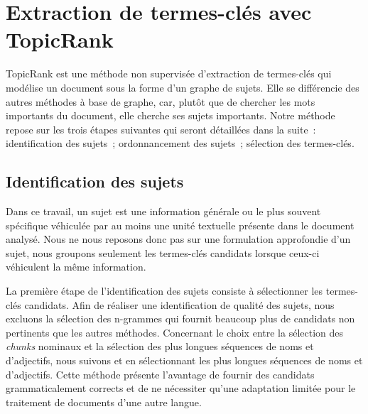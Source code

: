 \section{Extraction de termes-clés avec TopicRank}
\label{sec:extraction_de_termes_cles_avec_topicrank}
  TopicRank est une méthode non supervisée d'extraction de termes-clés qui
  modélise un document sous la forme d'un graphe de sujets.
  Elle se différencie des autres méthodes à base de graphe, car, plutôt que de
  chercher les mots importants du document, elle cherche ses sujets importants.
  Notre méthode repose sur les trois étapes suivantes qui seront détaillées dans
  la suite~: identification des sujets~; ordonnancement des sujets~; sélection des termes-clés.

  \subsection{Identification des sujets}
  \label{subsec:identification_des_sujets}
    Dans ce travail, un sujet est une information générale ou le plus souvent
    spécifique véhiculée par au moins une unité textuelle présente dans le
    document analysé. Nous ne nous reposons donc pas sur une formulation
    approfondie d'un sujet, nous groupons seulement les termes-clés candidats
    lorsque ceux-ci véhiculent la même information.

    La première étape de l'identification des sujets consiste à sélectionner les
    termes-clés candidats.
    Afin de réaliser une identification de qualité des sujets, nous excluons la
    sélection des n-grammes qui fournit beaucoup plus de candidats non
    pertinents que les autres méthodes. Concernant le choix entre la sélection
    des \textit{chunks} nominaux et la sélection des plus longues séquences de
    noms et d'adjectifs, nous suivons  et
     en sélectionnant les plus longues séquences
    de noms et d'adjectifs. Cette méthode présente l'avantage de fournir des
    candidats grammaticalement corrects et de ne nécessiter qu'une adaptation
    limitée pour le traitement de documents d'une autre langue.

